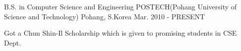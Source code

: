 
\begin{cventries}

  \cventry
  {B.S. in Computer Science and Engineering} %
  {POSTECH(Pohang University of Science and Technology)} %
  {Pohang, S.Korea} %
  {Mar. 2010 - PRESENT} %
  {
    \begin{cvitems} %
    \item {Got a Chun Shin-Il Scholarship which is given to promising students in CSE Dept.}
    \end{cvitems}
  }

\end{cventries}
